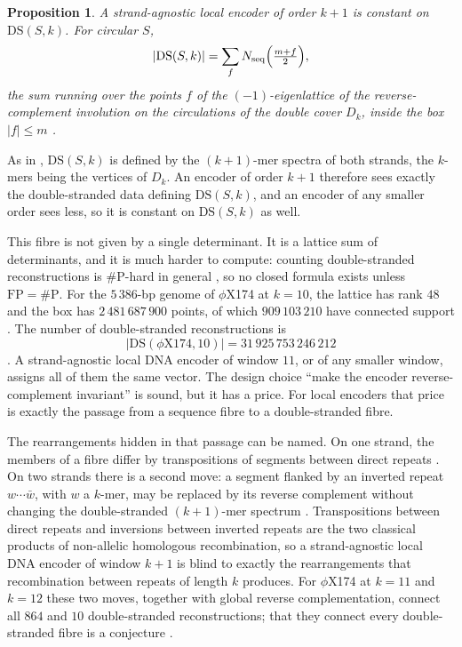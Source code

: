 \documentclass[11pt]{article}
\theoremstyle{plain}
\newtheorem{proposition}[theorem]{Proposition}
\theoremstyle{definition}
\theoremstyle{remark}
\newcommand{\DS}{\mathrm{DS}}
\begin{document}
\begin{proposition}\label{prop:ds}
A strand-agnostic local encoder of order $k+1$ is constant on $\DS(S,k)$. For circular $S$,
\[
|\DS(S,k)|=\sum_{f}N_{\mathrm{seq}}\Bigl(\tfrac{m+f}{2}\Bigr),
\]
the sum running over the points $f$ of the $(-1)$-eigenlattice of the reverse-complement involution
on the circulations of the double cover $D_k$, inside the box $|f|\le m$
\cite[Ch.~7, Theorem~7.6, p.~52]{AG}.
\end{proposition}

As in \cite[Ch.~7, Definition~7.3, p.~51]{AG}, $\DS(S,k)$ is defined by the $(k+1)$-mer spectra of both
strands, the $k$-mers being the vertices of $D_k$. An encoder of order $k+1$ therefore sees exactly the
double-stranded data defining $\DS(S,k)$, and an encoder of any smaller order sees less, so it is
constant on $\DS(S,k)$ as well.

This fibre is not given by a single determinant. It is a lattice sum of determinants, and it is
much harder to compute: counting double-stranded reconstructions is $\#$P-hard in general
\cite[Ch.~10, Corollary~10.6, p.~78]{AG}, so no closed formula exists unless $\mathrm{FP}=\#\mathrm{P}$.
For the $5\,386$-bp genome of $\phi$X174 at $k=10$, the lattice has rank $48$
and the box has $2\,481\,687\,900$ points, of which $909\,103\,210$ have connected support
\cite[Ch.~8, Section~8.5 and Table~8.2, p.~63]{AG}.
The number of double-stranded reconstructions is
\[
|\DS(\phi\mathrm{X}174,10)|=31\,925\,753\,246\,212
\]
\cite[Ch.~9, Section~9.8 and Table~9.1, pp.~72--73]{AG}. A strand-agnostic local DNA encoder of window
$11$, or of any smaller window, assigns all of them the same vector. The design choice ``make the encoder reverse-complement invariant'' is sound, but it has a
price. For local encoders that price is exactly the passage from a sequence fibre to a
double-stranded fibre.

The rearrangements hidden in that passage can be named. On one strand, the members of a fibre differ by
transpositions of segments between direct repeats \cite{Ukk92,Pev95}. On two strands there is a second
move: a segment flanked by an inverted repeat $w\cdots\bar w$, with $w$ a $k$-mer, may be replaced by its
reverse complement without changing the double-stranded $(k+1)$-mer spectrum
\cite[Ch.~11, Theorem~11.1, p.~84]{AG}. Transpositions between direct repeats and inversions between
inverted repeats are the two classical products of non-allelic homologous recombination, so a
strand-agnostic local DNA encoder of window $k+1$ is blind to exactly the rearrangements that
recombination between repeats of length $k$ produces. For $\phi$X174 at $k=11$ and $k=12$ these two moves,
together with global reverse complementation, connect all $864$ and $10$ double-stranded
reconstructions; that they connect every double-stranded fibre is a conjecture
\cite[Ch.~11, Section~11.4 and Conjecture~11.2, pp.~85--86]{AG}.
\end{document}
